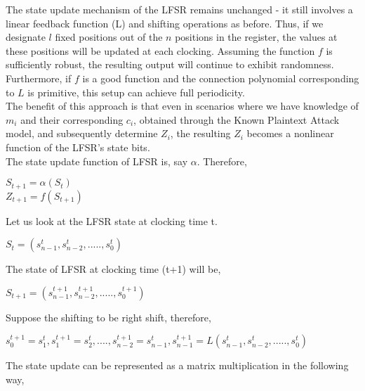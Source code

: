 \documentclass[11pt]{article}
\begin{document}
The state update mechanism of the LFSR remains unchanged - it still involves a linear feedback function (L) and shifting operations as before. Thus, if we designate $l$ fixed positions out of the $n$ positions in the register, the values at these positions will be updated at each clocking. Assuming the function $f$ is sufficiently robust, the resulting output will continue to exhibit randomness. Furthermore, if $f$ is a good function and the connection polynomial corresponding to $L$ is primitive, this setup can achieve full periodicity.\\
\newline
The benefit of this approach is that even in scenarios where we have knowledge of $m_i$ and their corresponding $c_i$, obtained through the Known Plaintext Attack model, and subsequently determine $Z_i$, the resulting $Z_i$ becomes a nonlinear function of the LFSR's state bits.
\\
\newline
The state update function of LFSR is, say $\alpha$. Therefore, 
\begin{center}
    $S_{t+1} = \alpha(S_t)$\\
    $Z_{t+1} = f(S_{t+1})$
\end{center}
Let us look at the LFSR state at clocking time t.
\begin{center}
    $S_t = (s_{n-1}^t, s_{n-2}^t,....., s_0^t)$
\end{center}
The state of LFSR at clocking time (t+1) will be, 
\begin{center}
    $S_{t+1} = (s_{n-1}^{t+1}, s_{n-2}^{t+1},....., s_0^{t+1})$
\end{center}
Suppose the shifting to be right shift, therefore, 
\begin{center}
    $s_0^{t+1} = s_1^t, s_1^{t+1} = s_2^t,....,s_{n-2}^{t+1} = s_{n-1}^t, s_{n-1}^{t+1} = L(s_{n-1}^t, s_{n-2}^t,....., s_0^t)$
\end{center}
The state update can be represented as a matrix multiplication in the following way,
\end{document}

